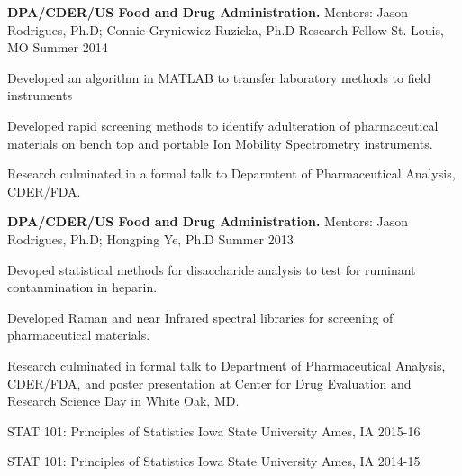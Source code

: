 \documentclass[11pt, a4paper]{awesome-cv}
\begin{document}
\begin{cventries}
  \cventry
    {\textbf{DPA/CDER/US Food and Drug Administration.} \newline Mentors: Jason Rodrigues, Ph.D; Connie Gryniewicz-Ruzicka, Ph.D}
    {Research Fellow}
    {St. Louis, MO}
    {Summer 2014 \newline}
    {
      \begin{cvitems}
        \item {Developed an algorithm in MATLAB to transfer laboratory methods to field instruments}
        \item {Developed rapid screening methods to identify adulteration of pharmaceutical materials on bench top and portable Ion Mobility Spectrometry instruments.}
        \item {Research culminated in a formal talk to Deparmtent of Pharmaceutical Analysis, CDER/FDA.}
      \end{cvitems}
    }
\end{cventries}
\vspace*{-\baselineskip}
\begin{cventries}
  \cventry
    {\textbf{DPA/CDER/US Food and Drug Administration.} \newline Mentors: Jason Rodrigues, Ph.D; Hongping Ye, Ph.D}
    {}
    {}
    {Summer 2013 \newline}
    {
      \begin{cvitems}
        \item {Devoped statistical methods for disaccharide analysis to test for ruminant contanmination in heparin. }
        \item {Developed Raman and near Infrared spectral libraries for screening of pharmaceutical materials.}
        \item {Research culminated in formal talk to Department of Pharmaceutical Analysis, CDER/FDA, and poster presentation at Center for Drug Evaluation and Research Science Day in White Oak, MD.}
      \end{cvitems}
    }
    \end{cventries}
\vspace*{-2\baselineskip}
\begin{cvhonors}
  \cvhonor
    {STAT 101: Principles of Statistics}
    {Iowa State University}
    {Ames, IA}
    {2015-16}
 \end{cvhonors}
\begin{cvhonors}
  \cvhonor
    {STAT 101: Principles of Statistics}
    {Iowa State University}
    {Ames, IA}
    {2014-15}
 \end{cvhonors}
\end{document}
